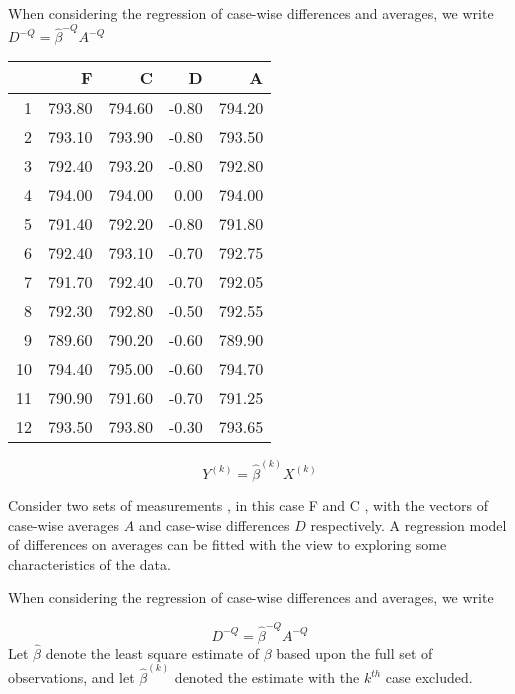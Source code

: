 \documentclass[12pt, a4paper]{article}
\begin{document}
When considering the regression of case-wise differences and averages, we write $D^{-Q} = \hat{\beta}^{-Q}A^{-Q}$


\begin{table}[ht]
	\begin{center}
		\begin{tabular}{rrrrr}
			\hline
			& F & C & D & A \\
			\hline
			1 & 793.80 & 794.60 & -0.80 & 794.20 \\
			2 & 793.10 & 793.90 & -0.80 & 793.50 \\
			3 & 792.40 & 793.20 & -0.80 & 792.80 \\
			4 & 794.00 & 794.00 & 0.00 & 794.00 \\
			5 & 791.40 & 792.20 & -0.80 & 791.80 \\
			6 & 792.40 & 793.10 & -0.70 & 792.75 \\
			7 & 791.70 & 792.40 & -0.70 & 792.05 \\
			8 & 792.30 & 792.80 & -0.50 & 792.55 \\
			9 & 789.60 & 790.20 & -0.60 & 789.90 \\
			10 & 794.40 & 795.00 & -0.60 & 794.70 \\
			11 & 790.90 & 791.60 & -0.70 & 791.25 \\
			12 & 793.50 & 793.80 & -0.30 & 793.65 \\
			\hline
		\end{tabular}
	\end{center}
\end{table}



\begin{equation}
Y^{(k)} = \hat{\beta}^{(k)}X^{(k)}
\end{equation}

Consider two sets of measurements , in this case F and C , with the vectors of case-wise averages $A$ and case-wise differences $D$ respectively. A regression model of differences on averages can be fitted with the view to exploring some characteristics of the data.

When considering the regression of case-wise differences and averages, we write

\begin{equation}
D^{-Q} = \hat{\beta}^{-Q}A^{-Q}
\end{equation}
Let $\hat{\beta}$ denote the least square estimate of $\beta$ based upon the full set of observations, and let $\hat{\beta}^{(k)}$ denoted the estimate with the $k^{th}$ case excluded.
\end{document}
